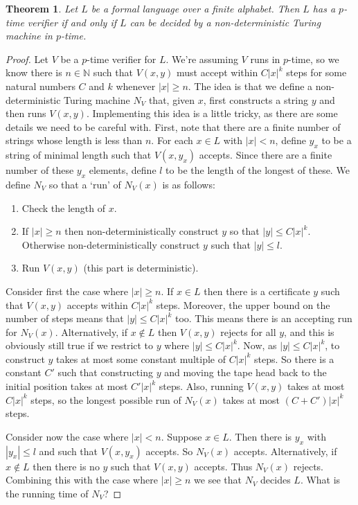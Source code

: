 \documentclass{article}
\theoremstyle{plain}
\newtheorem{theorem}{Theorem}[section]{\bfseries}{\itshape}
\theoremstyle{definition}
\newcommand{\bbN}{\mathbb{N}}
\begin{document}
\begin{theorem}\label{T:NP}
Let $L$ be a formal language over a finite alphabet. Then $L$ has a $p$-time verifier if and only if $L$ can be decided by a non-deterministic Turing machine in $p$-time.
\end{theorem}
\begin{proof}
Let $V$ be a $p$-time verifier for $L$. We're assuming $V$ runs in $p$-time, so we know there is $n\in\bbN$ such that $V(x,y)$ must accept within $C|x|^k$ steps for some natural numbers $C$ and $k$ whenever $|x|\geq n$. The idea is that we define a non-deterministic Turing machine $N_V$ that, given $x$, first constructs a string $y$ and then runs $V(x,y)$. Implementing this idea is a little tricky, as there are some details we need to be careful with. First, note that there are a finite number of strings whose length is less than $n$. For each $x\in L$ with $|x|<n$, define $y_x$ to be a string of minimal length such that $V(x,y_x)$ accepts. Since there are a finite number of these $y_x$ elements, define $l$ to be the length of the longest of these. We define $N_V$ so that a `run' of $N_V(x)$ is as follows:
\begin{enumerate}
\item Check the length of $x$.
\item If $|x|\geq n$ then non-deterministically construct $y$ so that $|y|\leq C|x|^k$. Otherwise non-deterministically construct $y$ such that $|y|\leq l$.
\item Run $V(x,y)$ (this part is deterministic).
\end{enumerate}

Consider first the case where $|x|\geq n$. If $x\in L$ then there is a certificate $y$ such that $V(x,y)$ accepts within $C|x|^k$ steps. Moreover, the upper bound on the number of steps means that $|y|\leq C|x|^k$ too. This means there is an accepting run for $N_V(x)$. Alternatively, if $x\notin L$ then $V(x,y)$ rejects for all $y$, and this is obviously still true if we restrict to $y$ where $|y|\leq C|x|^k$. Now, as $|y|\leq C|x|^k$, to construct $y$ takes at most some constant multiple of $C|x|^k$ steps. So there is a constant $C'$ such that constructing $y$ and moving the tape head back to the initial position takes at most $C'|x|^k$ steps. Also, running $V(x,y)$ takes at most $C|x|^k$ steps, so the longest possible run of $N_V(x)$ takes at most $(C+C')|x|^k$ steps.

Consider now the case where $|x|<n$. Suppose $x\in L$. Then there is $y_x$ with $|y_x|\leq l$ and such that $V(x,y_x)$ accepts. So $N_V(x)$ accepts. Alternatively, if $x\notin L$ then there is no $y$ such that $V(x,y)$ accepts. Thus $N_V(x)$ rejects. Combining this with the case where $|x|\geq n$ we see that $N_V$ decides $L$. What is the running time of $N_V$?  


\end{proof}
\end{document}
